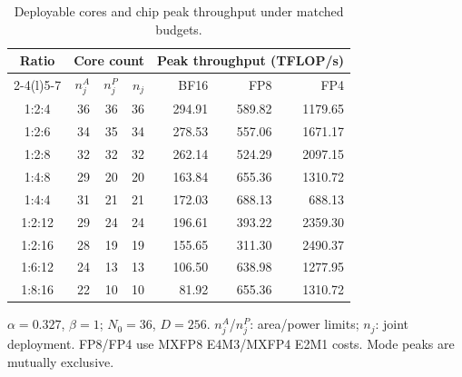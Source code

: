 \begin{table}[t]
\centering
\caption{Deployable cores and chip peak throughput under matched budgets.}
\label{tab:deployment_capacity}
\begingroup\footnotesize\setlength{\tabcolsep}{3pt}
\begin{tabular}{@{}crrrrrr@{}}\toprule
Ratio & \multicolumn{3}{c}{Core count} & \multicolumn{3}{c}{Peak throughput (TFLOP/s)} \\
\cmidrule(lr){2-4}\cmidrule(l){5-7}
 & $n_j^A$ & $n_j^P$ & $n_j$ & BF16 & FP8 & FP4 \\\midrule
1:2:4 & 36 & 36 & 36 & 294.91 & 589.82 & 1179.65 \\
1:2:6 & 34 & 35 & 34 & 278.53 & 557.06 & 1671.17 \\
1:2:8 & 32 & 32 & 32 & 262.14 & 524.29 & 2097.15 \\
1:4:8 & 29 & 20 & 20 & 163.84 & 655.36 & 1310.72 \\
1:4:4 & 31 & 21 & 21 & 172.03 & 688.13 & 688.13 \\
1:2:12 & 29 & 24 & 24 & 196.61 & 393.22 & 2359.30 \\
1:2:16 & 28 & 19 & 19 & 155.65 & 311.30 & 2490.37 \\
1:6:12 & 24 & 13 & 13 & 106.50 & 638.98 & 1277.95 \\
1:8:16 & 22 & 10 & 10 & 81.92 & 655.36 & 1310.72 \\
\bottomrule\end{tabular}
\par\vspace{2pt}\raggedright\scriptsize
$\alpha=0.327$, $\beta=1$; $N_0=36$, $D=256$.
$n_j^A$/$n_j^P$: area/power limits; $n_j$: joint deployment.
FP8/FP4 use MXFP8 E4M3/MXFP4 E2M1 costs. Mode peaks are mutually exclusive.
\endgroup
\end{table}
